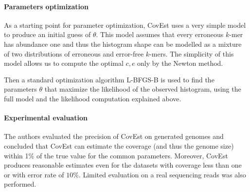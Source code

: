 \paragraph{Parameters optimization}
As a starting point for parameter optimization, CovEst uses a very simple model
to produce an initial guess of $\theta$. This model assumes that every
erroneous $k$-mer has abundance one and thus the histogram shape can be modelled
as a mixture of two distributions of erroneous and error-free $k$-mers. The
simplicity of this model allows us to compute the optimal $c, e$ only by the Newton method.

Then a standard optimization algorithm L-BFGS-B is used to find the parameters $\theta$
that maximize the likelihood of the observed histogram, using the full model and the
likelihood computation explained above.

\paragraph{Experimental evaluation}
The authors evaluated the precision of CovEst on generated genomes \cite{Hozza2015}
and concluded that CovEst can estimate the coverage (and thus the genome size) within 1\% 
of the true value for the common parameters. Moreover, CovEst produces reasonable
estimates even for the datasets with coverage less than one or with error rate of $10\%$.
Limited evaluation on a real sequencing reads was also performed.